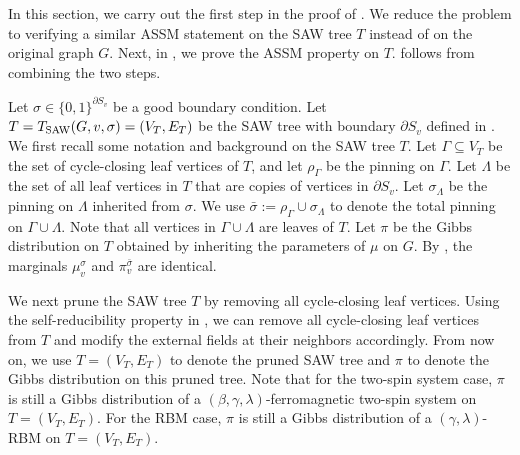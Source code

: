 \documentclass[11pt]{amsart}
\newcommand{\defeq}{:=}
\theoremstyle{definition}
\theoremstyle{remark}
\begin{document}
In this section, we carry out the first step in the proof of . We reduce the problem to verifying a similar ASSM statement on the SAW tree $T$ instead of on the original graph $G$.
Next, in , we prove the ASSM property on $T$. 
 follows from combining the two steps. %

Let $\sigma \in \{0,1\}^{\partial S_v}$ be a good boundary condition.
Let $T = T_{\textnormal{SAW}}(G,v,\sigma) = (V_T,E_T)$ be the SAW tree with boundary $\partial S_v$ defined in .
We first recall some notation and background on the SAW tree $T$.
Let $\Gamma \subseteq V_T$ be the set of cycle-closing leaf vertices of $T$, and let $\rho_\Gamma$ be the pinning on $\Gamma$. Let $\Lambda$ be the set of all leaf vertices in $T$ that are copies of vertices in $\partial S_v$. Let $\sigma_{\Lambda}$ be the pinning on $\Lambda$ inherited from $\sigma$. We use $\bar{\sigma} \defeq \rho_\Gamma \cup \sigma_{\Lambda}$ to denote the total pinning on $\Gamma \cup \Lambda$. Note that all vertices in $\Gamma \cup \Lambda$ are leaves of $T$. Let $\pi$ be the Gibbs distribution on $T$ obtained by inheriting the parameters of $\mu$ on $G$. By , the marginals $\mu_v^\sigma$ and $\pi_v^{\bar{\sigma}}$ are identical.


We next prune the SAW tree $T$ by removing all cycle-closing leaf vertices. Using the self-reducibility property in , we can remove all cycle-closing leaf vertices from $T$ and modify the external fields at their neighbors accordingly. 
From now on, we use $T = (V_T,E_T)$ to denote the pruned SAW tree and $\pi$ to denote the Gibbs distribution on this pruned tree.
Note that for the two-spin system case, $\pi$ is still a Gibbs distribution of a $(\beta,\gamma,\lambda)$-ferromagnetic two-spin system on $T = (V_T,E_T)$. For the RBM case, $\pi$ is still a Gibbs distribution of a $(\gamma,\lambda)$-RBM on $T = (V_T,E_T)$. 


\end{document}
